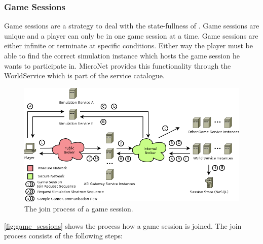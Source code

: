 \subsubsection{Game Sessions}

Game sessions are a strategy to deal with the state-fullness of \ogs{}. Game
sessions are unique and a player can only be in one game session at a time. Game
sessions are either infinite or terminate at specific conditions. Either way
the player must be able to find the correct simulation instance which hosts the
game session he wants to participate in. MicroNet provides this functionality
through the WorldService which is part of the service catalogue.

\begin{figure}
	\centering
  	\includegraphics[width=\textwidth]{images/architecture/GameSessions}
	\caption{The join process of a game session.}
	\label{fig:game_sessions}
\end{figure}

\autoref{fig:game_sessions} shows the process how a game session is joined.
The join process consists of the following steps:

